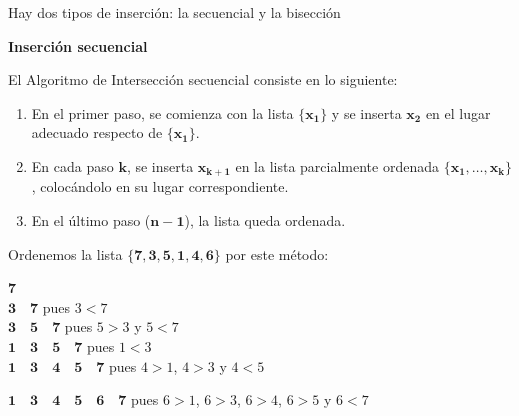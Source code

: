 \documentclass[ebook,oneside]{memoir}
\newcommand{\bolds}[1]{\boldsymbol{#1}}
\begin{document}
Hay dos tipos de inserci\'{o}n: la secuencial y la bisecci\'{o}n
\vspace{0.5cm}

\textbf{Inserci\'{o}n secuencial}
\vspace{0.2cm}

 El Algoritmo de Intersecci\'{o}n secuencial consiste en lo siguiente:

        \begin{enumerate}
            \item En el primer paso, se comienza con la lista $\bolds{\{x_1\}}$ y se inserta $\bolds{x_2}$ en el lugar adecuado respecto de $\bolds{\{x_1\}}$.
            \item En cada paso $\bolds{k}$, se inserta $\bolds{x_{k+1}}$ en la lista parcialmente ordenada $\bolds{\{x_1,\ldots,x_k\}}$, coloc\'{a}ndolo en su lugar correspondiente.
            \item En el \'{u}ltimo paso ($\bolds{n-1}$), la lista queda ordenada.
        \end{enumerate}

 \vspace{0.6cm}
Ordenemos la lista $\bolds{\{7, 3, 5, 1, 4, 6\}}$ por este método:
 \vspace{0.3cm}


        $\bolds{7}$\\

        $\bolds{3\quad 7}$ \hspace*{0.5cm} pues $3<7$\\

        $\bolds{3\quad 5\quad 7}$ \hspace*{0.5cm} pues $5>3$ y $5<7$\\

        $\bolds{1\quad 3\quad 5\quad 7}$ \hspace*{0.5cm} pues $1<3$\\

        $\bolds{1\quad 3\quad 4\quad 5\quad 7}$ \hspace*{0.5cm} pues $4>1$, $4>3$ y $4<5$\\

        \medskip

        $\bolds{1\quad 3\quad 4\quad 5\quad 6\quad 7}$ \hspace*{0.5cm} pues $6>1$, $6>3$, $6>4$, $6>5$ y $6<7$\\


\vspace{3cm}
\end{document}
